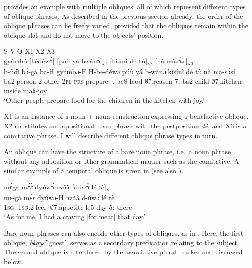 \noindent {} provides an example with multiple obliques, all of which represent different types of oblique phrases. As described in the previous section already, the order of the oblique phrases can be freely varied, provided that the obliques remain within the oblique slot and do not move to the objects' position.

\ea\label{OBL1}  S V O X1 X2 X3\\
  \glll  [bùdì bɔ́gà bá]\textsubscript{{\SBJ}} gyámbó [bédéwɔ̀]\textsubscript{{\OBJ}} [púù yá bwánɔ̀]\textsubscript{\textsc{x}1} [kìsínì dé tù]\textsubscript{\textsc{x}2} [nà màsɔ̀sí]\textsubscript{\textsc{x}3}\\
         {\db}b-ùdì bɔ́-gà ba-H gyámbɔ-H {\db}H-be-déwɔ̀ {\db}púù yá b-wánɔ̀ {\db}kìsínì dé tù {\db}nà ma-sɔ̀sí\\
        {\db}ba2-person 2-other 2\textsc{pl}-\textsc{prs} prepare-{\R} {\db}{\OBJ}.{\LINK}-be8-food {\db}$\emptyset$7.reason 7:{\ATT} ba2-child {\db}$\emptyset$7.kitchen {\LOC} inside {\db}{\COM} ma6-joy\\
    \trans `Other people prepare food for the children in the kitchen with joy.'
\z

\noindent X1 is an instance of a noun + noun construction expressing a benefactive oblique. X2 constitutes an adpositional noun phrase with the postposition {\itshape dé}, and X3 is a comitative phrase. I will describe different oblique phrase types in turn.

An oblique can have the structure of a bare noun phrase, i.e.\  a noun phrase without any adposition or other grammatical marker such as  the comitative. A similar example of a temporal oblique is given in  (see also ).

\ea \label{OBLbare}
  \glll mɛ̀gà mɛ́ɛ̀ dyúwɔ́ nzã́ã̀ [dúwɔ̀ lé tè]\textsubscript{\textsc{x}} \\
       mɛ-gà mɛ́ɛ̀ dyúwɔ-H nzã́ã̀ {\db}d-úwɔ̀ lé tè \\
         1\textsc{sg}-{\CONTR} 1\textsc{sg}.{\PST}2 feel-{\R} $\emptyset$7.appetite {\db}le5-day 5:{\ATT} there\\
    \trans `As for me, I had a craving [for meat] that day.'
\z

Bare noun phrases can also encode other types of obliques, as in . Here, the first oblique, {\itshape bàgyɛ̃̂} `guest', serves as a secondary predication relating to the subject. The second oblique is introduced by the associative plural marker and discussed below.

